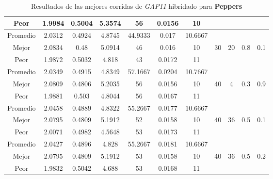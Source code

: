 \begin{table}[h!]
\begin{center}
\begin{tabular}{|c|c|c|c|c|c|c|c|c|c|c|}
            Peor & 1.9984 & 0.5004  & 5.3574 & 56 & 0.0156 & 10 &  &  &  & \\
        \hline
        \hline
            Promedio  & 2.0312 & 0.4924 & 4.8745 & 44.9333 & 0.017 & 10.6667 &  &  &  & \\
            \cline{1-7}
            Mejor & 2.0834 & 0.48  & 5.0914 & 46 & 0.016 & 10 & 30 & 20 & 0.8 & 0.1\\
            \cline{1-7}
            Peor & 1.9872 & 0.5032  & 4.818 & 43 & 0.0172 & 11 &  &  &  & \\
        \hline
        \hline
            Promedio  & 2.0349 & 0.4915 & 4.8349 & 57.1667 & 0.0204 & 10.7667 &  &  &  & \\
            \cline{1-7}
            Mejor & 2.0809 & 0.4806  & 5.2035 & 56 & 0.0156 & 10 & 40 & 4 & 0.3 & 0.9\\
            \cline{1-7}
            Peor & 1.9881 & 0.503  & 4.8044 & 56 & 0.0167 & 11 &  &  &  & \\
        \hline
        \hline
            Promedio  & 2.0458 & 0.4889 & 4.8322 & 55.2667 & 0.0177 & 10.6667 &  &  &  & \\
            \cline{1-7}
            Mejor & 2.0795 & 0.4809  & 5.1912 & 52 & 0.0158 & 10 & 40 & 36 & 0.5 & 0.1\\
            \cline{1-7}
            Peor & 2.0071 & 0.4982  & 4.5648 & 53 & 0.0173 & 11 &  &  &  & \\
        \hline
        \hline
            Promedio  & 2.0427 & 0.4896 & 4.828 & 55.2667 & 0.0181 & 10.6667 &  &  &  & \\
            \cline{1-7}
            Mejor & 2.0795 & 0.4809  & 5.1912 & 53 & 0.0158 & 10 & 40 & 36 & 0.5 & 0.2\\
            \cline{1-7}
            Peor & 1.9832 & 0.5042  & 4.688 & 53 & 0.0168 & 11 &  &  &  & \\
        \hline
        \end{tabular}
        \caption{Resultados de las mejores corridas de \emph{GAP11} hibridado para {\bf Peppers}}
        \label{tb:tableGAP11}
    \end{center}
\end{table}
